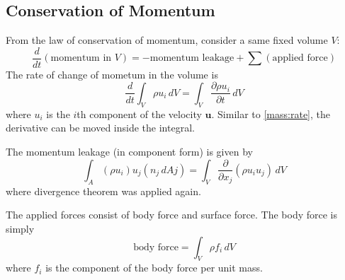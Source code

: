 \subsection{Conservation of Momentum} From the law of conservation of
momentum, consider a same fixed volume $V$:
\begin{equation}\label{mom:con}
    \frac{d}{dt}(\text{momentum in }V)= - \text{momentum leakage} +
    \sum(\text{applied force})
\end{equation}
The rate of change of mometum in the volume is
\begin{equation}\label{mom:rate}
    \frac{d}{dt}\int_V\rho u_i\,dV =
    \int_V\frac{\partial\rho u_i}{\partial t}\,dV
\end{equation}
where $u_i$ is the $i$th component of the velocity $\mathbf{u}$.
Similar to \eqref{mass:rate}, the derivative can be moved inside the
integral.

The momentum leakage (in component form) is given by
\begin{equation}\label{mom:leakage}
    \int_A(\rho u_i)u_j(n_j\,dAj) =
    \int_V\frac{\partial}{\partial x_j}(\rho u_i u_j)\,dV
\end{equation}
where divergence theorem was applied again.

The applied forces consist of body force and surface force. The body
force is simply
\begin{equation}\label{mom:bodyf}
    \text{body force} = \int_V\rho f_i\,dV
\end{equation}
where $f_i$ is the component of the body force per unit mass.


